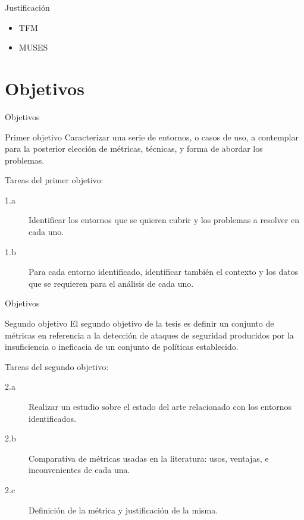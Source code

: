 \documentclass{beamer}
\begin{document}
\begin{frame}{Justificación}

\begin{itemize}
  \item TFM
  \item MUSES
\end{itemize}

\end{frame}


\section{Objetivos}

\begin{frame}{Objetivos}

\begin{block}{Primer objetivo}
Caracterizar una serie de entornos, o casos de uso, a contemplar para la posterior elección de métricas, técnicas, y forma de abordar los problemas.
\end{block}

Tareas del primer objetivo:

\begin{description}
  \item[1.a] Identificar los entornos que se quieren cubrir y los problemas a resolver en cada uno.
  \item[1.b] Para cada entorno identificado, identificar también el contexto y los datos que se requieren para el análisis de cada uno.
\end{description}

\end{frame}

\begin{frame}{Objetivos}

\begin{block}{Segundo objetivo}
El segundo objetivo de la tesis es definir un conjunto de métricas en referencia a la detección de ataques de seguridad producidos por la insuficiencia o ineficacia de un conjunto de políticas establecido.
\end{block}

Tareas del segundo objetivo:

\begin{description}
  \item[2.a] Realizar un estudio sobre el estado del arte
    relacionado con los entornos identificados. 
  \item[2.b] Comparativa de métricas usadas en la literatura: usos, ventajas, e inconvenientes de cada una.
  \item[2.c] Definición de la métrica y justificación de la misma.
\end{description}

\end{frame}
\end{document}

